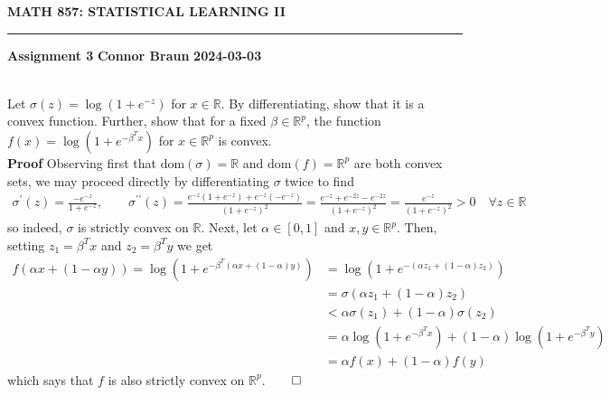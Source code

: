 \documentclass[10pt]{article}
\newcommand{\bp}[1]{\left({#1}\right)}
\newcommand{\mbb}[1]{\mathbb{#1}}
\newcommand{\1}[1]{\mathbbm{1}_{#1}}
\begin{document}
    \begin{center}
        {\bf\large{MATH 857: STATISTICAL LEARNING II}}
        \smallskip
        \hrule
        \smallskip
        {\bf Assignment 3} \hfill {\bf Connor Braun} \hfill {\bf 2024-03-03}
    \end{center}
    \\[5pt]
    Let $\sigma(z)=\log(1+e^{-z})$ for $x\in\mbb{R}$. By differentiating, show that it is a convex function. Further, show that for a fixed $\beta\in\mbb{R}^p$, the function
    $f(x)=\log(1+e^{-\beta^Tx})$ for $x\in\mbb{R}^p$ is convex.\\[5pt]
    {\bf Proof}\hspace{5pt} Observing first that $\text{dom}(\sigma)=\mbb{R}$ and $\text{dom}(f)=\mbb{R}^p$ are both convex sets, we may proceed directly by differentiating $\sigma$ twice to find
    \begin{align*}
        \sigma^\prime(z)=\frac{-e^{-z}}{1+e^{-z}},\qquad \sigma^{\prime\prime}(z)=\frac{e^{-z}(1+e^{-z})+e^{-z}(-e^{-z})}{(1+e^{-z})^2}=\frac{e^{-z}+e^{-2z}-e^{-2z}}{(1+e^{-z})^2}=\frac{e^{-z}}{(1+e^{-z})^2}>0\quad\forall z\in\mbb{R}
    \end{align*}
    so indeed, $\sigma$ is strictly convex on $\mbb{R}$. Next, let $\alpha\in[0,1]$ and $x,y\in\mbb{R}^p$. Then, setting $z_1=\beta^Tx$ and $z_2=\beta^Ty$ we get
    \begin{align*}
        f(\alpha x+(1-\alpha y))=\log\bp{1+e^{-\beta^T(\alpha x+(1-\alpha)y)}}&=\log\bp{1+e^{-(\alpha z_1+(1-\alpha)z_2)}}\\
        &=\sigma(\alpha z_1+(1-\alpha)z_2)\\
        &<\alpha\sigma(z_1)+(1-\alpha)\sigma(z_2)\tag{since $\sigma$ strictly convex}\\
        &=\alpha\log\bp{1+e^{-\beta^Tx}}+(1-\alpha)\log\bp{1+e^{-\beta^Ty}}\\
        &=\alpha f(x)+(1-\alpha)f(y)
    \end{align*}
    which says that $f$ is also strictly convex on $\mbb{R}^p$.\hfill{$\qed$}
\end{document}
